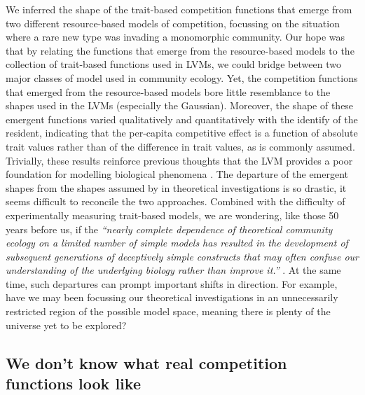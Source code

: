 \documentclass[a4paper,11pt]{article}
\begin{document}
We inferred the shape of the trait-based competition functions that emerge from two different resource-based models of competition, focussing on the situation where a rare new type was invading a monomorphic community. Our hope was that by relating the functions that emerge from the resource-based models to the collection of trait-based functions used in LVMs, we could bridge between two major classes of model used in community ecology. Yet, the competition functions that emerged from the resource-based models bore little resemblance to the shapes used in the LVMs (especially the Gaussian). Moreover, the shape of these emergent functions varied qualitatively and quantitatively with the identify of the resident, indicating that the per-capita competitive effect is a function of absolute trait values rather than of the difference in trait values, as is commonly assumed. Trivially, these results reinforce previous thoughts that the LVM provides a poor foundation for modelling biological phenomena \citep[e.g.]{Andrewartha-1953,  Neill-1974, Abrams-1975, Wangersky-1978, Abrams-1980, Tilman-1987, Abrams-2008}. The departure of the emergent shapes from the shapes assumed by in theoretical investigations is so drastic, it seems difficult to reconcile the two approaches. Combined with the difficulty of experimentally measuring trait-based models, we are wondering, like those 50 years before us, if the  \emph{``nearly complete dependence of theoretical community ecology on a limited number of simple models has resulted in the development of subsequent generations of deceptively simple constructs that may often confuse our understanding of the underlying biology rather than improve it.''}  \citep{Neill-1974}. At the same time, such departures can prompt important shifts in direction. For example, have we may been focussing our theoretical investigations in an unnecessarily restricted region of the possible model space, meaning there is plenty of the universe yet to be explored?

\subsection{We don't know what real competition functions look like}
\end{document}
